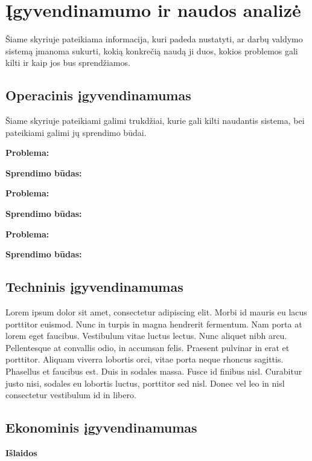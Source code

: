\documentclass{VUMIFPSkursinis}
\begin{document}
\section{Įgyvendinamumo ir naudos analizė}
Šiame skyriuje pateikiama informacija, kuri padeda nustatyti, ar darbų valdymo sistemą
įmanoma sukurti, kokią konkrečią naudą ji duos, kokios problemos gali kilti ir kaip jos bus sprendžiamos.

\subsection{Operacinis įgyvendinamumas}
Šiame skyriuje pateikiami galimi trukdžiai, kurie gali kilti naudantis sistema, bei pateikiami
galimi jų sprendimo būdai.
\bigskip

\textbf{Problema:}

\textbf{Sprendimo būdas:}

\bigskip

\textbf{Problema:}

\textbf{Sprendimo būdas:}

\bigskip

\textbf{Problema:}

\textbf{Sprendimo būdas:}

\subsection{Techninis įgyvendinamumas}
Lorem ipsum dolor sit amet, consectetur adipiscing elit. Morbi id mauris eu lacus porttitor euismod. Nunc in turpis in magna hendrerit fermentum. Nam porta at lorem eget faucibus. Vestibulum vitae luctus lectus. Nunc aliquet nibh arcu. Pellentesque at convallis odio, in accumsan felis. Praesent pulvinar in erat et porttitor. Aliquam viverra lobortis orci, vitae porta neque rhoncus sagittis. Phasellus et faucibus est. Duis in sodales massa. Fusce id finibus nisl. Curabitur justo nisi, sodales eu lobortis luctus, porttitor sed nisl. Donec vel leo in nisl consectetur vestibulum id in libero.

\subsection{Ekonominis įgyvendinamumas}

\textbf{Išlaidos}

\begin{table}[H]\footnotesize
	\centering
	\caption{Išlaidos reikalingos sistemos sukūrimui ir palaikymui}
\end{table}
\end{document}
